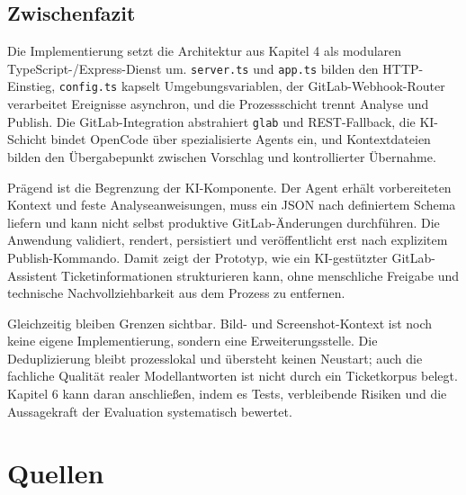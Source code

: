 \documentclass[12pt,a4paper,oneside]{scrreprt}
\begin{document}
\section{Zwischenfazit}

Die Implementierung setzt die Architektur aus Kapitel 4 als modularen TypeScript-/Express-Dienst um. \texttt{server.ts} und \texttt{app.ts} bilden den HTTP-Einstieg, \texttt{config.ts} kapselt Umgebungsvariablen, der GitLab-Webhook-Router verarbeitet Ereignisse asynchron, und die Prozessschicht trennt Analyse und Publish. Die GitLab-Integration abstrahiert \texttt{glab} und REST-Fallback, die KI-Schicht bindet OpenCode über spezialisierte Agents ein, und Kontextdateien bilden den Übergabepunkt zwischen Vorschlag und kontrollierter Übernahme.

Prägend ist die Begrenzung der KI-Komponente. Der Agent erhält vorbereiteten Kontext und feste Analyseanweisungen, muss ein JSON nach definiertem Schema liefern und kann nicht selbst produktive GitLab-Änderungen durchführen. Die Anwendung validiert, rendert, persistiert und veröffentlicht erst nach explizitem Publish-Kommando. Damit zeigt der Prototyp, wie ein KI-gestützter GitLab-Assistent Ticketinformationen strukturieren kann, ohne menschliche Freigabe und technische Nachvollziehbarkeit aus dem Prozess zu entfernen.

Gleichzeitig bleiben Grenzen sichtbar. Bild- und Screenshot-Kontext ist noch keine eigene Implementierung, sondern eine Erweiterungsstelle. Die Deduplizierung bleibt prozesslokal und übersteht keinen Neustart; auch die fachliche Qualität realer Modellantworten ist nicht durch ein Ticketkorpus belegt. Kapitel 6 kann daran anschließen, indem es Tests, verbleibende Risiken und die Aussagekraft der Evaluation systematisch bewertet.

\fi








\chapter*{Quellen}



\appendix


\iffalse
\end{document}
